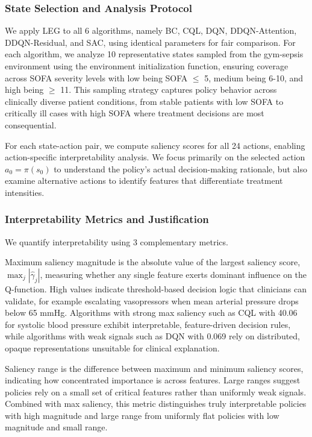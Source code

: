 \subsubsection{State Selection and Analysis Protocol}

We apply LEG to all 6 algorithms, namely BC, CQL, DQN, DDQN-Attention, DDQN-Residual, and SAC, using identical parameters for fair comparison. For each algorithm, we analyze 10 representative states sampled from the gym-sepsis environment using the environment initialization function, ensuring coverage across SOFA severity levels with low being SOFA $\leq$ 5, medium being 6-10, and high being $\geq$ 11. This sampling strategy captures policy behavior across clinically diverse patient conditions, from stable patients with low SOFA to critically ill cases with high SOFA where treatment decisions are most consequential.

For each state-action pair, we compute saliency scores for all 24 actions, enabling action-specific interpretability analysis. We focus primarily on the selected action $a_0 = \pi(s_0)$ to understand the policy's actual decision-making rationale, but also examine alternative actions to identify features that differentiate treatment intensities.

\subsubsection{Interpretability Metrics and Justification}

We quantify interpretability using 3 complementary metrics.

Maximum saliency magnitude is the absolute value of the largest saliency score, $\max_j |\hat{\gamma}_j|$, measuring whether any single feature exerts dominant influence on the Q-function. High values indicate threshold-based decision logic that clinicians can validate, for example escalating vasopressors when mean arterial pressure drops below 65 mmHg. Algorithms with strong max saliency such as CQL with 40.06 for systolic blood pressure exhibit interpretable, feature-driven decision rules, while algorithms with weak signals such as DQN with 0.069 rely on distributed, opaque representations unsuitable for clinical explanation.

Saliency range is the difference between maximum and minimum saliency scores, indicating how concentrated importance is across features. Large ranges suggest policies rely on a small set of critical features rather than uniformly weak signals. Combined with max saliency, this metric distinguishes truly interpretable policies with high magnitude and large range from uniformly flat policies with low magnitude and small range.

